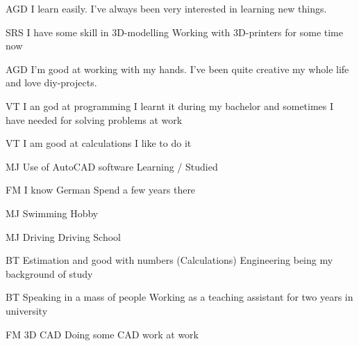AGD
I learn easily. 
I've always been very interested in learning new things.

SRS
I have some skill in 3D-modelling
Working with 3D-printers for some time now


AGD
I'm good at working with my hands.
I've been quite creative my whole life and love diy-projects.

VT
I an god at programming
I learnt it during my bachelor and sometimes I have needed for solving problems at work

VT
I am good at calculations
I like to do it

MJ
Use of AutoCAD software
Learning / Studied

FM
I know German
Spend a few years there


MJ
Swimming
Hobby

MJ
Driving
Driving School

BT
Estimation and good with numbers (Calculations)
Engineering being my background of study

BT
Speaking in a mass of people
Working as a teaching assistant for two years in university


FM
3D CAD
Doing some CAD work at work